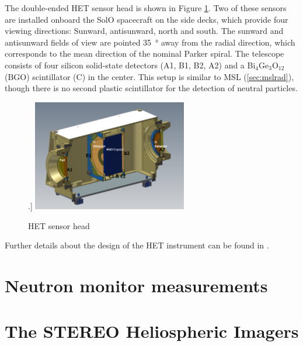 The double-ended \ac{HET} sensor head is shown in Figure \ref{fig:het-sensorhead}. Two of these sensors are installed onboard the \ac{SolO} spacecraft on the side decks, which provide four viewing directions: Sunward, antisunward, north and south. The sunward and antisunward fields of view are pointed \SI{35}{\degree} away from the radial direction, which corresponds to the mean direction of the nominal Parker spiral. The telescope consists of four silicon solid-state detectors (A1, B1, B2, A2) and a Bi$_4$Ge$_3$O$_{12}$ (BGO) scintillator (C) in the center. This setup is similar to \ac{MSL} (\autoref{sec:mslrad}), though there is no second plastic scintillator for the detection of neutral particles.



\begin{figure}
    \centering
    \subfloat[\acs{CAD} rendering of the \ac{HET} sensor head. Taken from \citet[Fig. 31]{RodriguezPacheco-2019-EPD}.]{
    	\includegraphics[width=0.6\textwidth]{images/het.png}
    	\label{subfig:het-sensorhead-cad}
    }\\
    \caption[\acs{HET} sensor head]{\acs{HET} sensor head}
    \label{fig:het-sensorhead}
\end{figure}

Further details about the design of the \ac{HET} instrument can be found in \cite{Elftmann-2020-PhD}. 

\section{Neutron monitor measurements}
\label{sec:neutronmonitors}

\section{The STEREO Heliospheric Imagers}
\label{sec:stereohi}

